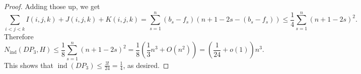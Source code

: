 \documentclass[reqno,11pt]{amsart}
\numberwithin{equation}{section}
\theoremstyle{definition}
\theoremstyle{remark}
\DeclareMathOperator{\ind}{ind}
\begin{document}
\begin{proof}
    Adding those up, we get
    \[\sum_{i<j<k}I(i,j,k)+J(i,j,k)+K(i,j,k) = \sum_{s=1}^{n}(b_s-f_s)\left(n+1-2s-(b_s-f_s)\right)\leq \frac{1}{4}\sum_{s=1}^{n}\left(n+1-2s\right)^2.\]
    Therefore 
    \[N_{\ind}(DP_3,H)\leq \frac{1}{8}\sum_{s=1}^{n}(n+1-2s)^2 = \frac{1}{8}\left(\frac{1}{3}n^3+O(n^2)\right) = \left(\frac{1}{24}+o(1)\right)n^3.\]
    This shows that $\ind(DP_3)\leq \frac{3!}{24}=\frac{1}{4}$, as desired.
    \end{proof}
\end{document}
